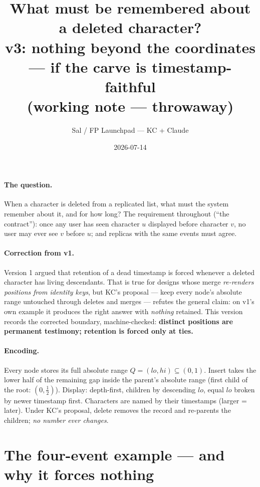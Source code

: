 \documentclass[11pt]{article}
\title{\bfseries What must be remembered about a deleted character?\\[2pt]
\large v3: nothing beyond the coordinates --- if the carve is
timestamp-faithful\\
(working note --- throwaway)}
\author{Sal / FP Launchpad --- KC + Claude}
\date{2026-07-14}
\begin{document}
\maketitle

\paragraph{The question.} When a character is deleted from a replicated
list, what must the system remember about it, and for how long? The
requirement throughout (``the contract''): once any user has seen
character $u$ displayed before character $v$, no user may ever see $v$
before $u$; and replicas with the same events must agree.

\paragraph{Correction from v1.} Version 1 argued that retention of a
dead timestamp is forced whenever a deleted character has living
descendants. That is true for designs whose merge \emph{re-renders
positions from identity keys}, but KC's proposal --- keep every node's
absolute range untouched through deletes and merges --- refutes the
general claim: on v1's own example it produces the right answer with
\emph{nothing} retained. This version records the corrected boundary,
machine-checked: \textbf{distinct positions are permanent testimony;
retention is forced only at ties.}

\paragraph{Encoding.} Every node stores its full absolute range
$Q = (lo, hi) \subseteq (0,1)$. Insert takes the lower half of the
remaining gap inside the parent's absolute range (first child of the
root: $(0,\tfrac12)$). Display: depth-first, children by descending
$lo$, equal $lo$ broken by newer timestamp first. Characters are named
by their timestamps (larger = later). Under KC's proposal, delete
removes the record and re-parents the children; \emph{no number ever
changes}.

\section{The four-event example --- and why it forces nothing}
\end{document}
